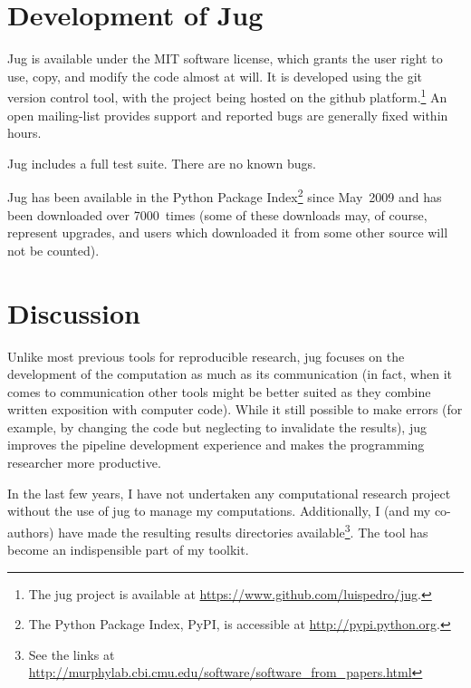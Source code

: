 \documentclass{article}
\begin{document}
\section{Development of Jug}
Jug is available under the MIT software license, which grants the user right to
use, copy, and modify the code almost at will. It is developed using the git
version control tool, with the project being hosted on the github
platform.\footnote{The jug project is available at
\url{https://www.github.com/luispedro/jug}.} An open mailing-list provides
support and reported bugs are generally fixed within hours.

Jug includes a full test suite. There are no known bugs.

Jug has been available in the Python Package Index\footnote{The Python Package
Index, PyPI, is accessible at \url{http://pypi.python.org}.} since May~2009
and has been downloaded over 7000~times (some of these downloads may, of
course, represent upgrades, and users which downloaded it from some other
source will not be counted).%

\section{Discussion}
Unlike most previous tools for reproducible research, jug focuses on the
development of the computation as much as its communication (in fact, when it
comes to communication other tools might be better suited as they combine
written exposition with computer code). While it still possible to make errors
(for example, by changing the code but neglecting to invalidate the results),
jug improves the pipeline development experience and makes the programming
researcher more productive.

In the last few years, I have not undertaken any computational research project
without the use of jug to manage my computations. Additionally, I (and my
co-authors) have made the resulting results directories available\footnote{See
the links at
\url{http://murphylab.cbi.cmu.edu/software/software_from_papers.html}}. The
tool has become an indispensible part of my toolkit.
\end{document}
